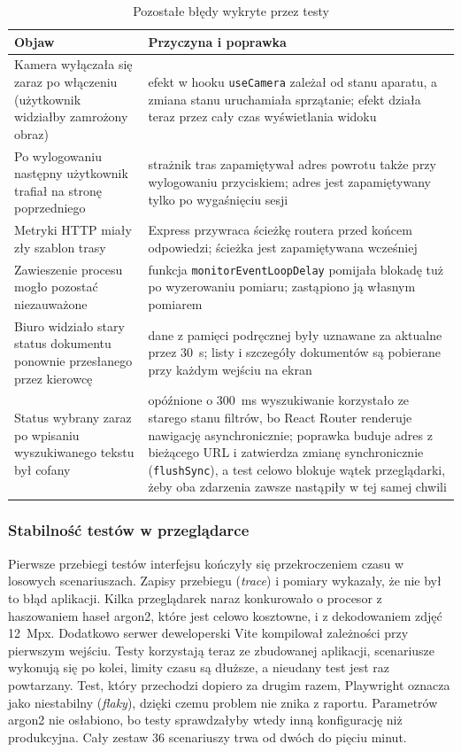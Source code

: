 \begin{table}[htbp]
\centering
\caption{Pozostałe błędy wykryte przez testy}
\label{tab:bledy-testy}
\small
\begin{tabular}{|p{}|p{}|}
\hline
\textbf{Objaw} & \textbf{Przyczyna i poprawka} \\
\hline
Kamera wyłączała się zaraz po włączeniu (użytkownik widziałby zamrożony obraz) & efekt w hooku \texttt{useCamera} zależał od stanu aparatu, a zmiana stanu uruchamiała sprzątanie; efekt działa teraz przez cały czas wyświetlania widoku \\
\hline
Po wylogowaniu następny użytkownik trafiał na stronę poprzedniego & strażnik tras zapamiętywał adres powrotu także przy wylogowaniu przyciskiem; adres jest zapamiętywany tylko po wygaśnięciu sesji \\
\hline
Metryki HTTP miały zły szablon trasy & Express przywraca ścieżkę routera przed końcem odpowiedzi; ścieżka jest zapamiętywana wcześniej \\
\hline
Zawieszenie procesu mogło pozostać niezauważone & funkcja \texttt{monitorEventLoopDelay} pomijała blokadę tuż po wyzerowaniu pomiaru; zastąpiono ją własnym pomiarem \\
\hline
Biuro widziało stary status dokumentu ponownie przesłanego przez kierowcę & dane z pamięci podręcznej były uznawane za aktualne przez 30~s; listy i szczegóły dokumentów są pobierane przy każdym wejściu na ekran \\
\hline
Status wybrany zaraz po wpisaniu wyszukiwanego tekstu był cofany & opóźnione o 300~ms wyszukiwanie korzystało ze starego stanu filtrów, bo React Router renderuje nawigację asynchronicznie; poprawka buduje adres z bieżącego URL i zatwierdza zmianę synchronicznie (\texttt{flushSync}), a test celowo blokuje wątek przeglądarki, żeby oba zdarzenia zawsze nastąpiły w tej samej chwili \\
\hline
\end{tabular}
\par
{}
\end{table}

\subsubsection{Stabilność testów w przeglądarce}

Pierwsze przebiegi testów interfejsu kończyły się przekroczeniem czasu
w losowych scenariuszach. Zapisy przebiegu (\emph{trace}) i pomiary wykazały,
że nie był to błąd aplikacji. Kilka przeglądarek naraz konkurowało o procesor
z haszowaniem haseł argon2, które jest celowo kosztowne, i z dekodowaniem
zdjęć 12~Mpx. Dodatkowo serwer deweloperski Vite kompilował zależności przy
pierwszym wejściu. Testy korzystają teraz ze zbudowanej aplikacji, scenariusze
wykonują się po kolei, limity czasu są dłuższe, a nieudany test jest raz
powtarzany. Test, który przechodzi dopiero za drugim razem, Playwright oznacza
jako niestabilny (\emph{flaky}), dzięki czemu problem nie znika z raportu.
Parametrów argon2 nie osłabiono, bo testy sprawdzałyby wtedy inną konfigurację
niż produkcyjna. Cały zestaw 36 scenariuszy trwa od dwóch do pięciu minut.

